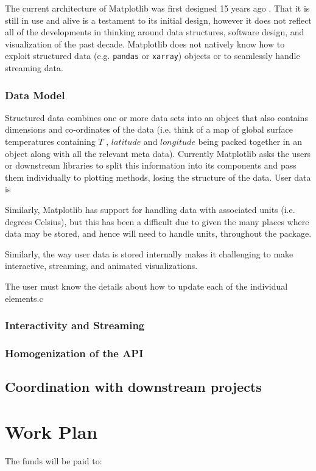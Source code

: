 \documentclass[11pt]{article}  %
\begin{document}
The current architecture of Matplotlib was first designed 15 years ago
\cite{Hunter:2007}.  That it is still in use and alive is a testament
to its initial design, however it does not reflect all of the
developments in thinking around data structures, software design, and
visualization of the past decade.  Matplotlib does not natively know
how to exploit structured data (e.g. \texttt{pandas} or
\texttt{xarray}) objects or to seamlessly handle streaming data.

\subsubsection{Data Model}

Structured data combines one or more data sets into an object that
also contains dimensions and co-ordinates of the data (i.e. think of a
map of global surface temperatures containing $T$ , $latitude$ and
$longitude$ being packed together in an object along with all the
relevant meta data).  Currently Matplotlib asks the users or
downstream libraries to split this information into its components and
pass them individually to plotting methods, losing the structure of
the data.  User data is

Similarly, Matplotlib has support for handling data with associated
units (i.e. degrees Celsius), but this has been a difficult due to
given the many places where data may be stored, and hence will need to
handle units, throughout the package.

Similarly, the way user data is
stored internally makes it challenging to make interactive, streaming,
and animated visualizations.

The user must know the details about how
to update each of the individual elements.c

\subsubsection{Interactivity and Streaming}
\subsubsection{Homogenization of the API}

\subsection{Coordination with downstream projects}

\section{Work Plan}
The funds will be paid to:
\end{document}

